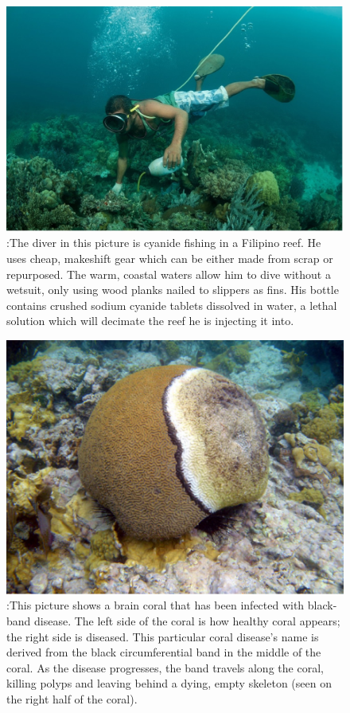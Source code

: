 \documentclass{book}\usepackage{knitr}
\begin{document}
{\begin{figure}
\includegraphics[width=\linewidth]{images/cyanidefishing}
\caption{:The diver in this picture is cyanide fishing in a Filipino reef. He uses cheap, makeshift gear which can be either made from scrap or repurposed. The warm, coastal waters allow him to dive without a wetsuit, only using wood planks nailed to slippers as fins. His bottle contains crushed sodium cyanide tablets dissolved in water, a lethal solution which will decimate the reef he is injecting it into.}
\label{fig:Cyanide Fishing}
\end{figure}

\begin{figure}
\includegraphics[width=\linewidth]{images/coraldisease}
\caption{:This picture shows a brain coral that has been infected with black-band disease. The left side of the coral is how healthy coral appears; the right side is diseased. This particular coral disease’s name is derived from the black circumferential band in the middle of the coral. As the disease progresses, the band travels along the coral, killing polyps and leaving behind a dying, empty skeleton (seen on the right half of the coral).}
\label{fig:Black Band Disease}
\end{figure}

}
\end{document}
